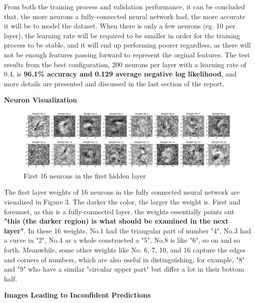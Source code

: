 \documentclass{article} %
\begin{document}
  From both the training process and validation performance, it can be concluded that, the more neurons a fully-connected neural network had, the more accurate it will be to model the dataset. When there is only a few neurons (eg. 10 per layer), the learning rate will be required to be smaller in order for the training process to be stable, and it will end up performing poorer regardless, as there will not be enough features passing forward to represent the orginal features. The test results from the best configuration, 200 neurons per layer with a learning rate of 0.4, is \textbf{96.1\% accuracy and 0.129 average negative log likelihood}, and more details are presented and discussed in the last section of the report.


\vspace{1cm}
\textbf{Neuron Visualization}

  \begin{figure}[!hb]
    \centering
    \includegraphics[width=\linewidth]{A4_3.png}
    \caption{First 16 neurons in the first hidden layer}
    \label{fig:3}
  \end{figure}

  The first layer weights of 16 neurons in the fully connected neural network are visualized in Figure 3. The darker the color, the larger the weight is. First and foremost, as this is a fully-connected layer, the weights essentially points out \textbf{"this (the darker region) is what should be examined in the next layer"}. In these 16 weights, No.1 had the triangular part of number "4", No.3 had a curve in "2", No.4 as a whole constructed a "5", No.8 is like "6", so on and so forth. Meanwhile, some other weights like No. 6, 7, 10, and 16 capture the edges and corners of numbers, which are also useful in distinguishing, for example, "8" and "9" who have a similar "circular upper part" but differ a lot in their bottom half.

\vspace{1cm}
\textbf{Images Leading to Inconfident Predictions}
\end{document}
